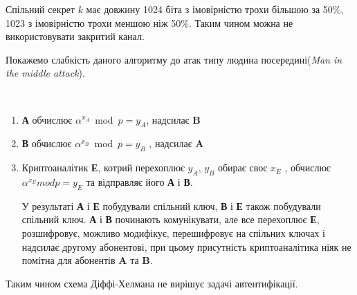 Спільний секрет $k$ має довжину 1024 біта з імовірністю трохи більшою за 50\%, 1023 з імовірністю трохи меншою ніж 50\%.
Таким чином можна не використовувати закритий канал.

Покажемо слабкість даного алгоритму до атак типу людина посередині(\textit{Man in the middle attack}).

\begin{algorithm}\
\begin{enumerate}
\item \textbf{А} обчислює $\alpha ^{x_A} \bmod p = y_A $, надсилає \textbf{B} 

\item \textbf{В} обчислює $\alpha ^{x_B} \bmod p = y_B $ , надсилає \textbf{A}

\item Криптоаналітик \textbf{Е}, котрий перехоплює $y_A$, $y_B$ обирає своє $x_E$ , обчислює $\alpha ^{x_E} mod p = y_E $ та відправляє його \textbf{А} і \textbf{В}.

У результаті \textbf{А} і \textbf{Е} побудували спільний ключ, \textbf{В} і \textbf{Е} також побудували спільний ключ. 
\textbf{А} і \textbf{В} починають комунікувати, але все перехоплює \textbf{Е}, розшифровує, можливо модифікує, перешифровує на спільних ключах і надсилає другому абонентові, при цьому присутність криптоаналітика ніяк не помітна для абонентів \textbf{A} та \textbf{B}.
\end{enumerate}

\end{algorithm}
Таким чином схема Діффі-Хелмана не вирішує задачі автентифікації.
